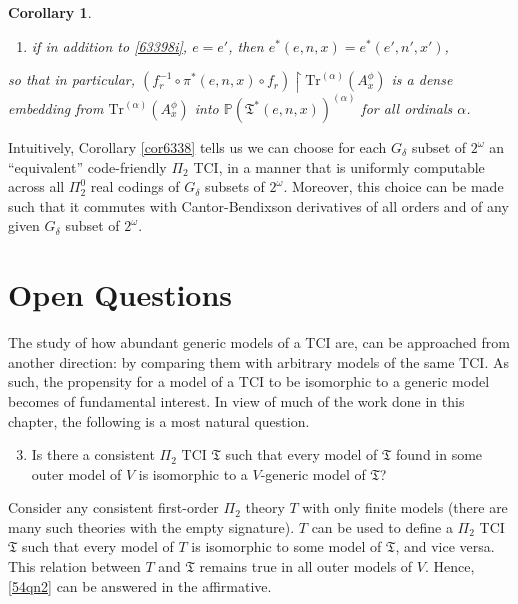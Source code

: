 \documentclass[12pt, twoside]{memoir}
\numberwithin{equation}{section}
\newtheorem{cor}[thm]{Corollary}
\theoremstyle{definition}
\theoremstyle{remark}
\theoremstyle{definition}
\theoremstyle{definition}
\theoremstyle{definition}
\theoremstyle{remark}
\begin{document}
\begin{cor}
\begin{enumerate}[label=(\arabic*)]
\begin{enumerate}[label=(\roman*)]
        \item if in addition to \ref{63398i}, $e = e'$, then $e^*(e, n, x) = e^*(e', n', x')$,
    \end{enumerate}
    so that in particular, $(f_r^{-1} \circ \pi^*(e, n, x) \circ f_r) \restriction \mathrm{Tr}^{(\alpha)}(A^{\phi}_x)$ is a dense embedding from $\mathrm{Tr}^{(\alpha)}(A^{\phi}_x)$ into $\mathbb{P}(\mathfrak{T}^*(e, n, x))^{(\alpha)}$ for all ordinals $\alpha$.
\end{enumerate} 
\end{cor}

Intuitively, Corollary \ref{cor6338} tells us we can choose for each $G_{\delta}$ subset of $2^{\omega}$ an ``equivalent'' code-friendly $\Pi_2$ TCI, in a manner that is uniformly computable across all $\Pi^0_2$ real codings of $G_{\delta}$ subsets of $2^{\omega}$. Moreover, this choice can be made such that it commutes with Cantor-Bendixson derivatives of all orders and of any given $G_{\delta}$ subset of $2^{\omega}$.

\section{Open Questions}

The study of how abundant generic models of a TCI are, can be approached from another direction: by comparing them with arbitrary models of the same TCI. As such, the propensity for a model of a TCI to be isomorphic to a generic model becomes of fundamental interest. In view of much of the work done in this chapter, the following is a most natural question.

\begin{enumerate}[label=(Q\arabic*)]
    \setcounter{enumi}{2}
    \item\label{54qn2} Is there a consistent $\Pi_2$ TCI $\mathfrak{T}$ such that every model of $\mathfrak{T}$ found in some outer model of $V$ is isomorphic to a $V$-generic model of $\mathfrak{T}$?
\end{enumerate}

Consider any consistent first-order $\Pi_2$ theory $T$ with only finite models (there are many such theories with the empty signature). $T$ can be used to define a $\Pi_2$ TCI $\mathfrak{T}$ such that every model of $T$ is isomorphic to some model of $\mathfrak{T}$, and vice versa. This relation between $T$ and $\mathfrak{T}$ remains true in all outer models of $V$. Hence, \ref{54qn2} can be answered in the affirmative. 
\end{document}
